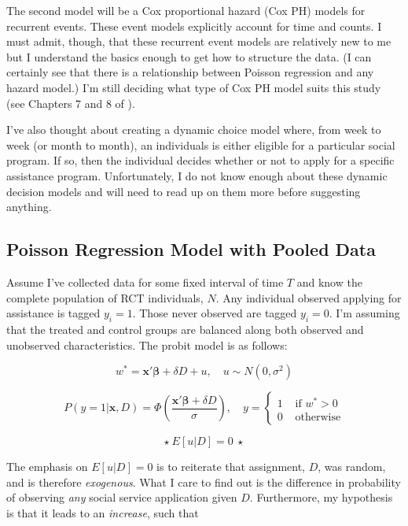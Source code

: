 \documentclass[12pt,letterpaperpaper,]{book}
\begin{document}
The second model will be a Cox proportional hazard (Cox PH) models for
recurrent events. These event models explicitly account for time and
counts. I must admit, though, that these recurrent event models are
relatively new to me but I understand the basics enough to get how to
structure the data. (I can certainly see that there is a relationship
between Poisson regression and any hazard model.) I'm still deciding
what type of Cox PH model suits this study (see Chapters 7 and 8 of
\citet{aalen_survival_2008}).

I've also thought about creating a dynamic choice model where, from week
to week (or month to month), an individuals is either eligible for a
particular social program. If so, then the individual decides whether or
not to apply for a specific assistance program. Unfortunately, I do not
know enough about these dynamic decision models and will need to read up
on them more before suggesting anything.

\subsection*{Poisson Regression Model with Pooled
Data}\label{poisson-regression-model-with-pooled-data}

Assume I've collected data for some fixed interval of time \(T\) and
know the complete population of RCT individuals, \(N\). Any individual
observed applying for assistance is tagged \(y_i=1\). Those never
observed are tagged \(y_i=0\). I'm assuming that the treated and control
groups are balanced along both observed and unobserved characteristics.
The probit model is as follows:

\[
w^* = \bm{x'\beta}  + \delta D + u, \quad u \sim N(0, \sigma^2)
\]

\[
P(y=1|\bm{x}, D) = \Phi \left (\frac{\bm{x'\beta}  + \delta D}{\sigma} \right ), \quad
y = \left \{ 
  \begin{array}{cc} 
    1 & \text{ if } w^* > 0 \\ 
    0 & \text{ otherwise}
  \end{array} 
  \right .
\]

\[
\star ~ E[u|D] = 0 ~ \star
\]

The emphasis on \(E[u|D] = 0\) is to reiterate that assignment, \(D\),
was random, and is therefore \emph{exogenous}. What I care to find out
is the difference in probability of observing \emph{any} social service
application given \(D\). Furthermore, my hypothesis is that it leads to
an \emph{increase}, such that
\end{document}
